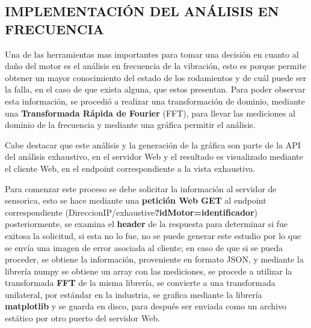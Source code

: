 
\subsection{IMPLEMENTACIÓN DEL ANÁLISIS EN FRECUENCIA}

Una de las herramientas mas importantes para tomar una decisión en cuanto
al daño del motor es el análisis en frecuencia de la vibración, esto es porque
permite obtener un mayor conocimiento del estado de los rodamientos y de cuál
puede ser la falla, en el caso de que exista alguna, que estos presentan. Para
poder observar esta información, se procedió a realizar una transformación de
dominio, mediante una \textbf{Transformada Rápida de Fourier} (FFT), para
llevar las mediciones al dominio de la frecuencia
y mediante una gráfica permitir el análisis.

Cabe destacar que este análisis y la generación de la gráfica son parte de la
API del análisis exhaustivo, en el servidor Web y el resultado es visualizado
mediante el cliente Web, en el endpoint correspondiente a la vista exhaustiva.

Para comenzar este proceso se debe  solicitar la información al servidor de
sensorica, esto se hace mediante una \textbf{petición Web GET} al endpoint
correspondiente (DireccionIP/exhaustive\textbf{?idMotor=identificador}) posteriormente,
se examina el \textbf{header} de la respuesta para determinar si fue exitosa
la solicitud, si esta no lo fue, no se puede generar este estudio por lo que se envía una
imagen de error asociada al cliente; en caso de que si se pueda proceder, se
obtiene la información, proveniente en formato JSON, y mediante la librería
numpy se obtiene un array con las mediciones, se procede a utilizar la transformada
\textbf{FFT} de la misma librería, se convierte a una transformada unilateral,
por estándar en la industria,  se grafica mediante la librería \textbf{matplotlib}
y se guarda en disco, para después ser enviada como un archivo estático por otro
puerto del servidor Web.
